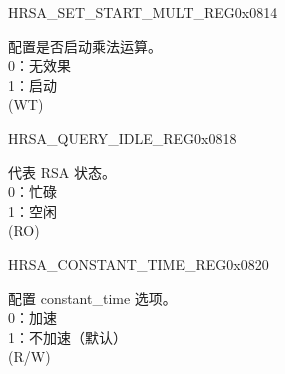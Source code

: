 \begin{register}{H}{RSA\_SET\_START\_MULT\_REG}{0x0814}\label{regdesc:RSASETSTARTMULTREG}
%
%
\regnewline%
\begin{regdesc}\begin{reglist}
\label{fielddesc:RSASETSTARTMULT}\item [RSA\_SET\_START\_MULT] 配置是否启动乘法运算。\\
0：无效果\\
1：启动\\
 (WT)
\end{reglist}\end{regdesc}
\end{register}


\begin{register}{H}{RSA\_QUERY\_IDLE\_REG}{0x0818}\label{regdesc:RSAQUERYIDLEREG}
%
%
\regnewline%
\begin{regdesc}\begin{reglist}
\label{fielddesc:RSAQUERYIDLE}\item [RSA\_QUERY\_IDLE] 代表 RSA 状态。\\
0：忙碌\\
1：空闲\\
 (RO)
\end{reglist}\end{regdesc}
\end{register}


\begin{register}{H}{RSA\_CONSTANT\_TIME\_REG}{0x0820}\label{regdesc:RSACONSTANTTIMEREG}
%
%
\regnewline%
\begin{regdesc}\begin{reglist}
\label{fielddesc:RSACONSTANTTIME}\item [RSA\_CONSTANT\_TIME] 配置 constant\_time 选项。\\
0：加速\\
1：不加速（默认）\\
 (R/W)
\end{reglist}\end{regdesc}
\end{register}


